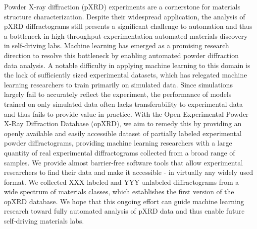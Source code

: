 Powder X-ray diffraction (pXRD) experiments are a cornerstone for materials structure characterization.
Despite their widespread application, the analysis of pXRD diffractograms still presents a significant challenge to automation and thus a bottleneck in high-throughput experimentation automated materials discovery in self-driving labs.
Machine learning has emerged as a promising research direction to resolve this bottleneck by enabling automated powder diffraction data analysis.
A notable difficulty in applying machine learning to this domain is the lack of sufficiently sized experimental datasets, which has relegated machine learning researchers to train primarily on simulated data. Since simulations largely fail to accurately reflect the experiment, the performance of models trained on only simulated data often lacks transferability to experimental data and thus fails to provide value in practice.
With the Open Experimental Powder X-Ray Diffraction Database (opXRD), we aim to remedy this by providing an openly available and easily accessible dataset of partially labeled experimental powder diffractograms, providing machine learning researchers with a large quantity of real experimental diffractograms collected from a broad range of samples.
We provide almost barrier-free software tools that allow experimental researchers to find their data and make it accessible - in virtually any widely used format.
We collected XXX labeled and YYY unlabeled diffractograms from a wide spectrum of materials classes, which establishes the first version of the opXRD database.
We hope that this ongoing effort can guide machine learning research toward fully automated analysis of pXRD data and thus enable future self-driving materials labs.